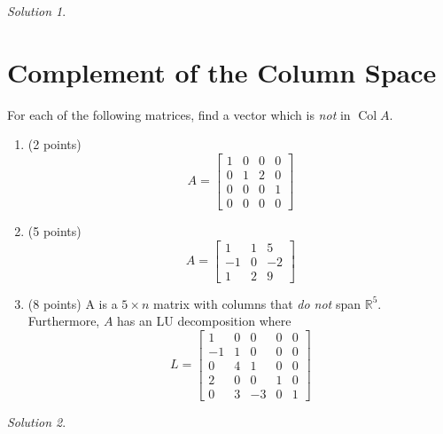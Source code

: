 \documentclass{article}
\theoremstyle{remark}
\newtheorem*{solution}{Solution}
\newcommand{\R}{\mathbb R}
\DeclareMathOperator{\col}{Col}
\begin{document}
\medskip

\begin{solution}
\end{solution}

\pagebreak
\section{Complement of the Column Space}

For each of the following matrices, find a vector which is \textit{not} in $\col A$.

\begin{enumerate}
\item (2 points)
  \begin{displaymath}
    A =
    \begin{bmatrix}
      1 & 0 & 0 & 0 \\
      0 & 1 & 2 & 0 \\
      0 & 0 & 0 & 1 \\
      0 & 0 & 0 & 0
    \end{bmatrix}
  \end{displaymath}
\item (5 points)
  \begin{displaymath}
    A =
    \begin{bmatrix}
      1 & 1 & 5 \\
      -1 & 0 & -2 \\
      1 & 2 & 9
    \end{bmatrix}
  \end{displaymath}
\item (8 points) A is a $5 \times n$ matrix with columns that \textit{do not} span $\R^5$.
  Furthermore, $A$ has an LU decomposition where
  \begin{displaymath}
    L =
    \begin{bmatrix}
      1 & 0 & 0 & 0 & 0 \\
      -1 & 1 & 0 & 0 & 0\\
      0 & 4 & 1 & 0 & 0\\
      2 & 0 & 0 & 1 & 0 \\
      0 & 3 & -3 & 0 & 1
    \end{bmatrix}
  \end{displaymath}

\end{enumerate}

\medskip

\begin{solution}
\end{solution}
\end{document}
